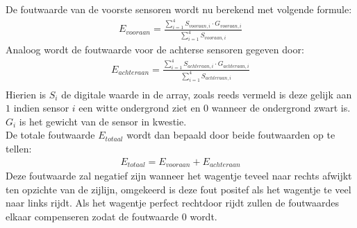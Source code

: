 De foutwaarde van de voorste sensoren wordt nu berekend met volgende formule:
\begin{gather*}
E_{vooraan} = \frac{\sum\limits_{i=1}^{4}S_{vooraan,i}\cdot G_{vooraan,i}}{\sum\limits_{i=1}^{4}S_{vooraan,i}}
\end{gather*}
Analoog wordt de foutwaarde voor de achterse sensoren gegeven door:
\begin{gather*}
E_{achteraan} = \frac{\sum\limits_{i=1}^{4}S_{achteraan,i}\cdot G_{achteraan,i}}{\sum\limits_{i=1}^{4}S_{achteraan,i}}\\
\end{gather*}
Hierien is $S_i$ de digitale waarde in de array, zoals reeds vermeld is deze gelijk aan $1$ indien sensor $i$ een witte ondergrond ziet en $0$ wanneer de ondergrond zwart is. $G_i$ is het gewicht van de sensor in kwestie.\\
De totale foutwaarde $E_{totaal}$ wordt dan bepaald door beide foutwaarden op te tellen:
\begin{gather*}
E_{totaal}=E_{vooraan}+E_{achteraan}
\end{gather*}
Deze foutwaarde zal negatief zijn wanneer het wagentje teveel naar rechts afwijkt ten opzichte van de zijlijn, omgekeerd is deze fout positef als het wagentje te veel naar links rijdt. Als het wagentje perfect rechtdoor rijdt zullen de foutwaardes elkaar compenseren zodat de foutwaarde $0$ wordt. 

